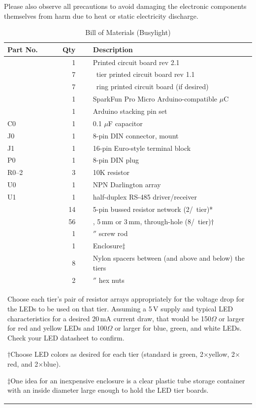  Please also observe all precautions to avoid damaging
the electronic components themselves from harm due to heat or static electricity discharge.
\begin{table}
    \begin{center}
	\begin{tabular}{lrll}\toprule
		{\bfseries Part No.}&{\bfseries Qty}&&{\bfseries Description}\\\midrule
		&1&&Printed circuit board rev 2.1\\
		&7&&\led\ tier printed circuit board rev 1.1\\
		&7&&\led\ ring printed circuit board (if desired)\\
		&1&&SparkFun Pro Micro Arduino-compatible $\mu$C\\
		&1&&Arduino stacking pin set\\
		C0&1&&0.1 $\mu$F capacitor\\
		J0&1&&8-pin DIN connector, \acronym{PCB} mount\\
		J1&1&&16-pin Euro-style terminal block\\
		P0&1&&8-pin DIN plug\\
		R0--2&3&&10K resistor\\
		U0&1&&\mc{ULN2003A} NPN Darlington array\\
		U1&1&&\mc{THVD1439} half-duplex RS-485 driver/receiver\\
		  &14&&5-pin bussed resistor network (2/\led\ tier)*\\
		  &56&&\led, 5\,mm or 3\,mm, through-hole (8/\led\ tier)$\dagger$\\
		  &1&&\sfrac14$''$ screw rod\\
		  &1&&Enclosure$\ddagger$\\
		  &8&&Nylon spacers between (and above and below) the tiers\\
		  &2&&\sfrac14$''$ hex nuts\\
		\bottomrule
		\multicolumn{4}{p{.9\textwidth}}{\tiny *Choose each tier's pair of resistor arrays appropriately for the voltage drop
		for the LEDs to be used on that tier. Assuming a 5\,V supply and
		typical LED characteristics for a desired 20\,mA current draw, that would be 150$\Omega$ or larger for red and yellow LEDs and 100$\Omega$ or larger
		for blue, green, and white LEDs. Check your LED datasheet to confirm.

		\noindent$\dagger$Choose LED colors as desired for each tier (standard is green, 2$\times$yellow, 2$\times$red,
		and 2$\times$blue).

		\noindent$\ddagger$One idea for an inexpensive enclosure is a clear plastic tube storage container with an inside
		diameter large enough to hold the LED tier boards.}
	\end{tabular}
	    \caption{Bill of Materials (Busylight)\label{fig:busylightbom}}
    \end{center}
\end{table}

